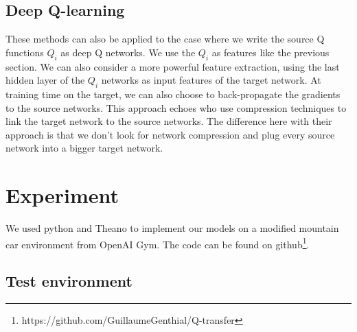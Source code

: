 \documentclass{article}
\newenvironment{myitemize}
{ \begin{itemize}
		\setlength{\itemsep}{0pt}
		\setlength{\parskip}{0pt}
		\setlength{\parsep}{0pt}     }
	{ \end{itemize}                  }
\begin{document}
\subsection{Deep Q-learning}\label{sec_deep-q}

These methods can also be applied to the case where we write the source Q functions $ Q_i $  as deep Q networks. We use the $Q_i$ as features like the previous section. We can also consider a more powerful feature extraction, using the last hidden layer of the $ Q_i $ networks as input features of the target network. At training time on the target, we can also choose to back-propagate the gradients to the source networks. This approach echoes \cite{DBLP:journals/corr/ParisottoBS15} who use compression techniques to link the target network to the source networks. The difference here with their approach is that we don't look for network compression and plug every source network into a bigger target network.

\section{Experiment}

We used python and Theano to implement our models on a modified mountain car environment from OpenAI Gym. The code can be found on github\footnote{https://github.com/GuillaumeGenthial/Q-transfer}.

\subsection{Test environment}\label{sec_env}

\end{document}
